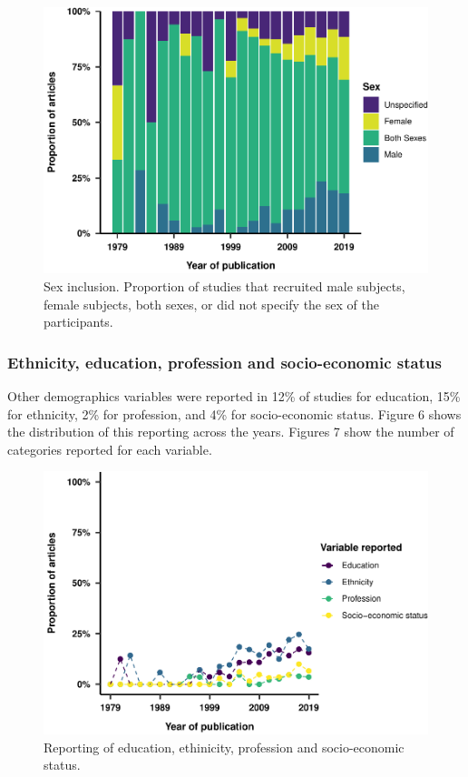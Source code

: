 \documentclass[
  english,
  jou,floatsintext]{apa6}
\begin{document}
\begin{figure}
\centering
\includegraphics{article_files/figure-latex/unnamed-chunk-9-1.pdf}
\caption{\label{fig:unnamed-chunk-9}Sex inclusion. Proportion of studies that recruited male subjects, female subjects, both sexes, or did not specify the sex of the participants.}
\end{figure}

\hypertarget{ethnicity-education-profession-and-socio-economic-status}{%
\subsubsection{Ethnicity, education, profession and socio-economic status}\label{ethnicity-education-profession-and-socio-economic-status}}

Other demographics variables were reported in 12\% of studies for education, 15\% for ethnicity, 2\% for profession, and 4\% for socio-economic status. Figure 6 shows the distribution of this reporting across the years. Figures 7 show the number of categories reported for each variable.

\begin{figure}
\centering
\includegraphics{article_files/figure-latex/unnamed-chunk-10-1.pdf}
\caption{\label{fig:unnamed-chunk-10}Reporting of education, ethinicity, profession and socio-economic status.}
\end{figure}
\end{document}
